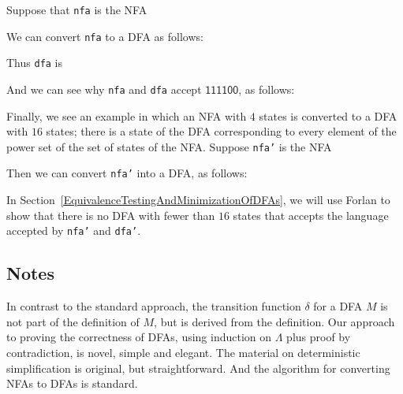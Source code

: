 Suppose that \texttt{nfa} is the NFA
\begin{center}

\end{center}
We can convert \texttt{nfa} to a DFA as follows:

Thus \texttt{dfa} is
\begin{center}

\end{center}
And we can see why \texttt{nfa} and \texttt{dfa} accept
$\mathsf{111100}$, as follows:


Finally, we see an example in which an NFA with $4$ states
is converted to a DFA with $16$ states; there is a state of the
DFA corresponding to every element of the power set of
the set of states of the NFA.  Suppose \texttt{nfa'} is
the NFA
\begin{center}

\end{center}
Then we can convert \texttt{nfa'} into a DFA, as follows:

In Section~\ref{EquivalenceTestingAndMinimizationOfDFAs},
we will use Forlan to show that there is no
DFA with fewer than $16$ states that accepts the language accepted
%
by \texttt{nfa'} and \texttt{dfa'}.

\subsection{Notes}

In contrast to the standard approach, the transition function $\delta$
for a DFA $M$ is not part of the definition of $M$, but is derived from
the definition.  Our approach to proving the correctness of DFAs,
using induction on $\Lambda$ plus proof by contradiction, is novel,
simple and elegant.  The material on deterministic simplification is
original, but straightforward.  And the algorithm for converting NFAs
to DFAs is standard.

